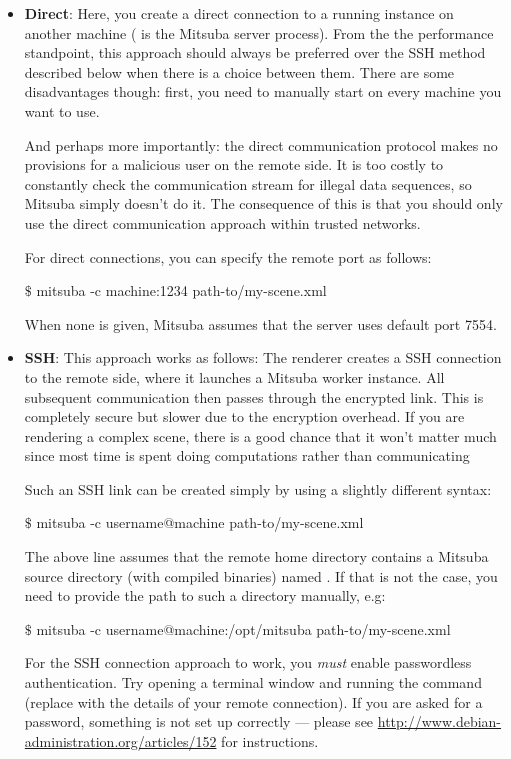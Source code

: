 \begin{itemize}
\item\textbf{Direct}: Here, you create a direct connection to a running  instance on
another machine ( is the Mitsuba server process). From the the performance 
standpoint, this approach should always be preferred over the SSH method described below when there is 
a choice between them. There are some disadvantages though: first, you need to manually start
 on every machine you want to use. 

And perhaps more importantly: the direct communication
protocol makes no provisions for a malicious user on the remote side. It is too costly
to constantly check the communication stream for illegal data sequences, so Mitsuba simply doesn't do it.
The consequence of this is that you should only use the direct communication approach within
trusted networks.

For direct connections, you can specify the remote port as follows:
\begin{shell}
$\texttt{\$}$ mitsuba -c machine:1234 path-to/my-scene.xml
\end{shell}
When none is given, Mitsuba assumes that the server uses default port 7554. 
\item \textbf{SSH}: 
    This approach works as follows: The renderer creates a SSH connection 
	to the remote side, where it launches a Mitsuba worker instance.
	All subsequent communication then passes through the encrypted link. 
	This is completely secure but slower due to the encryption overhead.
	If you are rendering a complex scene, there is a good chance that it
	won't matter much since most time is spent doing computations rather than
	communicating

	Such an SSH link can be created simply by using a slightly different syntax:
\begin{shell}
$\texttt{\$}$ mitsuba -c username@machine path-to/my-scene.xml
\end{shell}
	The above line assumes that the remote home directory contains
	a Mitsuba source directory (with compiled binaries) named .
	If that is not the case, you need to provide the path to such a directory manually, e.g:
\begin{shell}
$\texttt{\$}$ mitsuba -c username@machine:/opt/mitsuba path-to/my-scene.xml
\end{shell}
	For the SSH connection approach to work, you \emph{must} enable passwordless 
	authentication.
	Try opening a terminal window and running the command  
	(replace with the details of your remote connection).
	If you are asked for a password, something is not set up correctly --- please see 
	\url{http://www.debian-administration.org/articles/152} for instructions.


\end{itemize}
